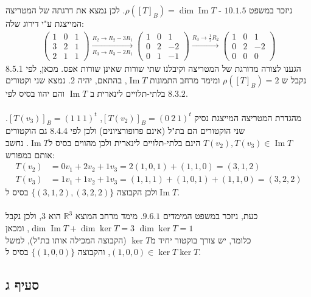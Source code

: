 \documentclass{article}
\DeclareMathOperator\Image{Im}
\def\reals{\mathbb{R}}
\begin{document}
ניזכר במשפט $10.1.5$ - $\rho([T]_B)=\dim \Image T$. לכן נמצא את דרגתה של המטריצה המייצגת ע"י דירוג שלה:
\begin{align*}
    \begin{pmatrix}
        1 & 0 & 1 \\
        3 & 2 & 1 \\
        2 & 1 & 1
    \end{pmatrix}
    \xrightarrow[R_3\rightarrow R_3-2R_1]{R_2\rightarrow R_2-3R_1}
    \begin{pmatrix}
        1 & 0 & 1  \\
        0 & 2 & -2 \\
        0 & 1 & -1
    \end{pmatrix}
    \xrightarrow[]{R_3\rightarrow \frac{1}{2}R_2}
    \begin{pmatrix}
        1 & 0 & 1  \\
        0 & 2 & -2 \\
        0 & 0 & 0
    \end{pmatrix}
\end{align*}
הגענו לצורה מדורגת של המטריצה וקיבלנו שתי שורות שאינן שורות אפס. מכאן, לפי 8.5.1 נקבל ש $\rho([T]_B)=2$ ומימד מרחב התמונות $\Image T$, בהתאם, יהיה $2$.
נמצא שני וקטורים בלתי-תלויים לינארית ב $\Image T$ והם יהוו בסיס לפי $8.3.2$.
\\\\
מהגדרת המטריצה המייצגת נסיק $[T(v_2)]_B=(0 \ 2 \ 1)^t$, $[T(v_3)]_B=(1 \ 1 \ 1)^t$. שני הוקטורים הם בת"ל (אינם פרופורציונים) ולכן לפי 8.4.4 גם הוקטורים $T(v_2), T(v_3)\in \Image T$ הינם בלתי-תלויים לינארית ולכן מהווים בסיס ל$\Image T$. נחשב אותם במפורש:
\begin{align*}
    T(v_2) & =0v_1+2v_2+1v_3 = 2(1,0,1)+(1,1,0)=(3,1,2)      \\
    T(v_3) & =1v_1+1v_2+1v_3=(1,1,1)+(1,0,1)+(1,1,0)=(3,2,2)
\end{align*}
ולכן הקבוצה $\{ (3,1,2), (3,2,2) \}$ בסיס ל$\Image T$.
\\\\
כעת, ניזכר במשפט המימדים $9.6.1$. מימד מרחב המוצא $\reals^3$ הוא $3$, ולכן נקבל $\dim \Image T + \dim \ker T=3$, ומכאן $\dim \ker T = 1$ \\
כלומר, יש צורך בוקטור יחיד מ$\ker T$ (הקבוצה המכילה אותו בת"ל), למשל $(1,0,0)\in \ker T$, והקבוצה $\{ (1,0,0) \}$ בסיס ל$\ker T$.

\pagebreak

\subsection*{סעיף ג}
\end{document}
